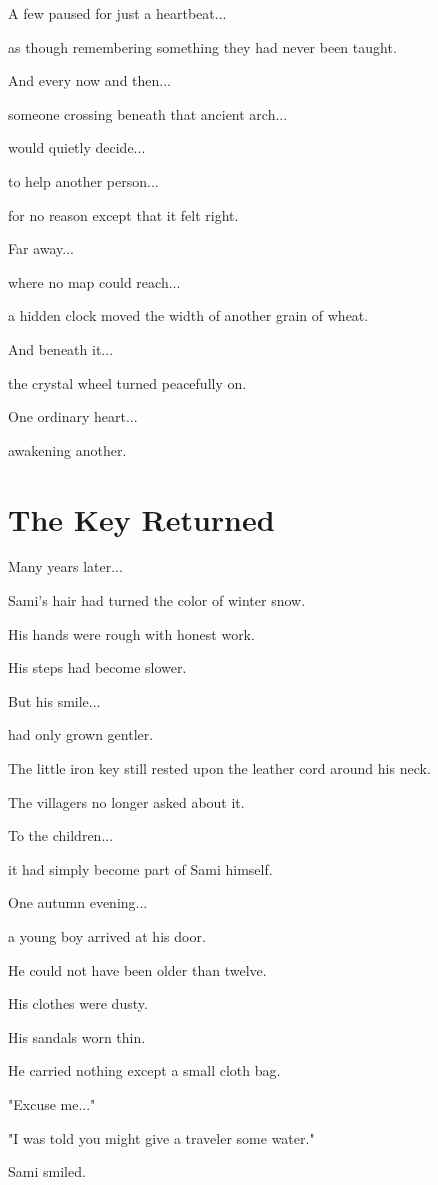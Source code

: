 \documentclass[12pt,openany]{book}
\begin{document}
A few paused for just a heartbeat...

as though remembering something they had never been taught.

And every now and then...

someone crossing beneath that ancient arch...

would quietly decide...

to help another person...

for no reason except that it felt right.

Far away...

where no map could reach...

a hidden clock moved the width of another grain of wheat.

And beneath it...

the crystal wheel turned peacefully on.

One ordinary heart...

awakening another.
\section*{The Key Returned}

Many years later...

Sami's hair had turned the color of winter snow.

His hands were rough with honest work.

His steps had become slower.

But his smile...

had only grown gentler.

The little iron key still rested upon the leather cord around his neck.

The villagers no longer asked about it.

To the children...

it had simply become part of Sami himself.

One autumn evening...

a young boy arrived at his door.

He could not have been older than twelve.

His clothes were dusty.

His sandals worn thin.

He carried nothing except a small cloth bag.

"Excuse me..."

"I was told you might give a traveler some water."

Sami smiled.
\end{document}
